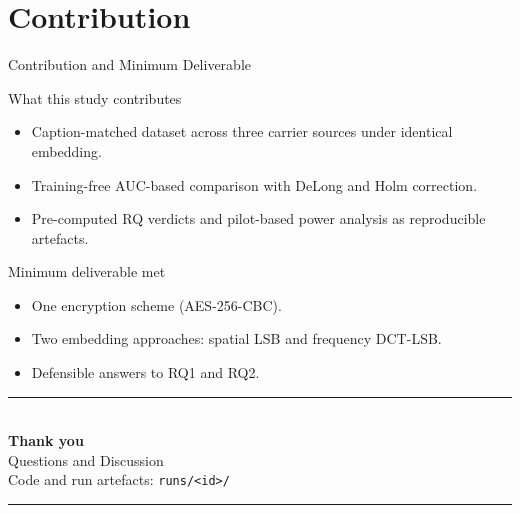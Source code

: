 \documentclass[aspectratio=169,11pt]{beamer}
\begin{document}
\section{Contribution}
\begin{frame}{Contribution and Minimum Deliverable}
\small
\begin{block}{What this study contributes}
\begin{itemize}
\item Caption-matched dataset across three carrier sources under identical embedding.
\item Training-free AUC-based comparison with DeLong and Holm correction.
\item Pre-computed RQ verdicts and pilot-based power analysis as reproducible artefacts.
\end{itemize}
\end{block}
\begin{block}{Minimum deliverable met}
\begin{itemize}
\item One encryption scheme (AES-256-CBC). \checkmark
\item Two embedding approaches: spatial LSB and frequency DCT-LSB. \checkmark
\item Defensible answers to RQ1 and RQ2. \checkmark
\end{itemize}
\end{block}
\end{frame}

\begin{frame}[plain]
\vfill
\begin{center}
{\color{umorange}\rule{0.32\textwidth}{2pt}}\\[14pt]
{\LARGE\bfseries\color{umdark}Thank you}\\[10pt]
{\large\color{umgray}Questions and Discussion}\\[16pt]
{\small\color{umgray}Code and run artefacts: \texttt{runs/<id>/}}\\[14pt]
{\color{umorange}\rule{0.32\textwidth}{2pt}}
\end{center}
\vfill
\end{frame}
\end{document}
